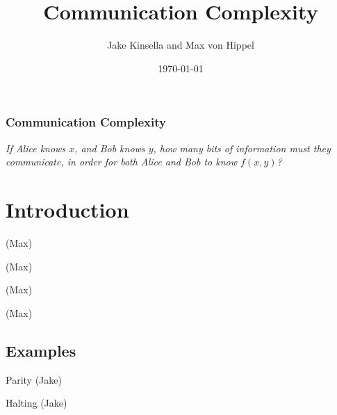 \documentclass{beamer}
\title{Communication Complexity}
\author{Jake Kinsella and Max von Hippel}
\institute{Northeastern University}
\date{\today}
\begin{document}
\frame{\titlepage}

\begin{frame}
\frametitle{Communication Complexity}
\emph{If Alice knows $x$, and Bob knows $y$, how many bits of information must they communicate, in order for both Alice and Bob to know $f(x, y)$?}
\end{frame}

\begin{frame}
\tableofcontents
\end{frame}


\section{Introduction}

\begin{frame}{(Max)}

\end{frame}

\begin{frame}{(Max)}

\end{frame}

\begin{frame}{(Max)}

\end{frame}

\begin{frame}{(Max)}

\end{frame}

\subsection{Examples}

\begin{frame}{Parity (Jake)}

\end{frame}

\begin{frame}{Halting (Jake)}

\end{frame}
\end{document}
